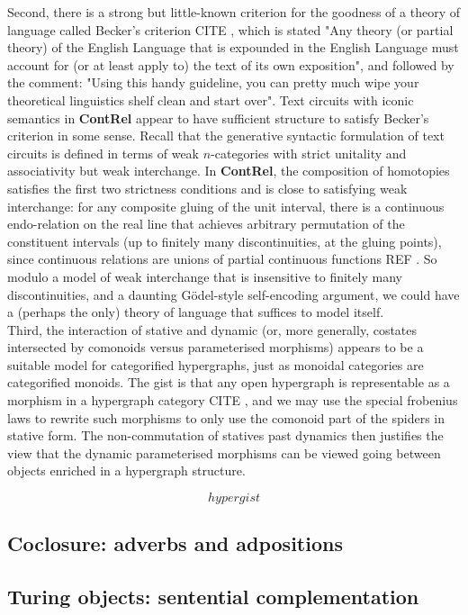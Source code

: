 Second, there is a strong but little-known criterion for the goodness of a theory of language called Becker's criterion \bR CITE \e, which is stated "Any theory (or partial theory) of the English Language that is expounded in the English Language must account for (or at least apply to) the text of its own exposition", and followed by the comment: "Using this handy guideline, you can pretty much wipe your theoretical linguistics shelf clean and start over". Text circuits with iconic semantics in \textbf{ContRel} appear to have sufficient structure to satisfy Becker's criterion in some sense. Recall that the generative syntactic formulation of text circuits is defined in terms of weak $n$-categories with strict unitality and associativity but weak interchange. In \textbf{ContRel}, the composition of homotopies satisfies the first two strictness conditions and is close to satisfying weak interchange: for any composite gluing of the unit interval, there is a continuous endo-relation on the real line that achieves arbitrary permutation of the constituent intervals (up to finitely many discontinuities, at the gluing points), since continuous relations are unions of partial continuous functions \bR REF \e. So modulo a model of weak interchange that is insensitive to finitely many discontinuities, and a daunting G\"{o}del-style self-encoding argument, we could have a (perhaps the only) theory of language that suffices to model itself.\\

Third, the interaction of stative and dynamic (or, more generally, costates intersected by comonoids versus parameterised morphisms) appears to be a suitable model for categorified hypergraphs, just as monoidal categories are categorified monoids. The gist is that any open hypergraph is representable as a morphism in a hypergraph category \bR CITE \e, and we may use the special frobenius laws to rewrite such morphisms to only use the comonoid part of the spiders in stative form. The non-commutation of statives past dynamics then justifies the view that the dynamic parameterised morphisms can be viewed going between objects enriched in a hypergraph structure.

\[hypergist\]

\subsection{Coclosure: adverbs and adpositions}



\subsection{Turing objects: sentential complementation}


